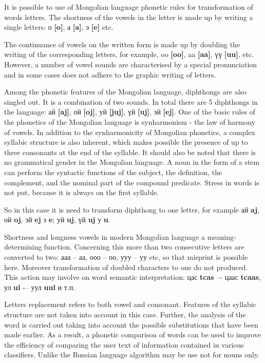 \documentclass{svproc}
\begin{document}
It is possible to use of Mongolian language phonetic rules for transformation of words letters. The shortness of the vowels in the letter is made up by writing a single letters: о \textbf{[o]}, а \textbf{[a]}, э \textbf{[e]} etc.

The continuance of vowels on the written form is made up by doubling the writing of the corresponding letters, for example, oo \textbf{[oo]}, aa \textbf{[aa]}, үү \textbf{[uu]}, etc. However, a number of vowel sounds are characterised by a special pronunciation and in some cases does not adhere to the graphic writing of letters.

Among the phonetic features of the Mongolian language, diphthongs are also singled out. It is a combination of two sounds. In total there are 5 diphthongs in the language: ай \textbf{[aj]}, ой \textbf{[oj]}, уй \textbf{[juj]}, үй \textbf{[uj]}, эй \textbf{[ej]}. One of the basic rules of the phonetics of the Mongolian language is synharmonism - the law of harmony of vowels. In addition to the synharmonicity of Mongolian phonetics, a complex syllabic structure is also inherent, which makes possible the presence of up to three consonants at the end of the syllable. It should also be noted that there is no grammatical gender in the Mongolian language. A noun in the form of a stem can perform the syntactic functions of the subject, the definition, the complement, and the nominal part of the compound predicate. Stress in words is not put, because it is always on the first syllable.

So in this case it is need to transform diphthong to one letter, for example ай \textbf{aj}, ой \textbf{oj}, эй \textbf{ej} \rightarrow э \textbf{e}; уй \textbf{uj}, үй \textbf{uj} \rightarrow у \textbf{u}.

Shortness and longness vowels in modern Mongolian language a meaning-determining function. Concerning this more than two consecutive letters are converted to two: ааа -- аа, ооо -- оо, ууу -- уу etc, so that misprint is possible here. Moreover transformation of doubled characters to one do not produced. This action may involve on word semantic interpretation: цас \textbf{tcas} –- цаас \textbf{tcaas}, ул \textbf{ul} -– уул \textbf{uul} и т.п.

Letters replacement refers to both vowel and consonant. Features of the syllabic structure are not taken into account in this case.
Further, the analysis of the word is carried out taking into account the possible substitutions that have been made earlier. As a result, a phonetic comparison of words can be used to improve the efficiency of comparing the user text of information contained in various classifiers. Unlike the Russian language algorithm may be use not for nouns only.
\end{document}

